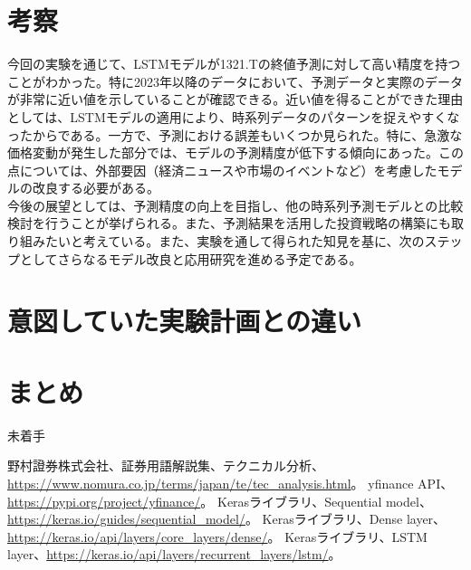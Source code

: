 \documentclass[a4paper, 11pt, titlepage]{jsarticle}
\begin{document}
\section{考察}
\indent 今回の実験を通じて、LSTMモデルが1321.Tの終値予測に対して高い精度を持つことがわかった。特に2023年以降のデータにおいて、予測データと実際のデータが非常に近い値を示していることが確認できる。近い値を得ることができた理由としては、LSTMモデルの適用により、時系列データのパターンを捉えやすくなったからである。一方で、予測における誤差もいくつか見られた。特に、急激な価格変動が発生した部分では、モデルの予測精度が低下する傾向にあった。この点については、外部要因（経済ニュースや市場のイベントなど）を考慮したモデルの改良する必要がある。\\
\indent 今後の展望としては、予測精度の向上を目指し、他の時系列予測モデルとの比較検討を行うことが挙げられる。また、予測結果を活用した投資戦略の構築にも取り組みたいと考えている。また、実験を通して得られた知見を基に、次のステップとしてさらなるモデル改良と応用研究を進める予定である。

\section{意図していた実験計画との違い}
\indent 
\section{まとめ}
未着手

\begin{thebibliography}{99}
   野村證券株式会社、証券用語解説集、テクニカル分析、\url{https://www.nomura.co.jp/terms/japan/te/tec_analysis.html}。
   yfinance API、\url{https://pypi.org/project/yfinance/}。
   Kerasライブラリ、Sequential model、\url{https://keras.io/guides/sequential_model/}。
   Kerasライブラリ、Dense layer、\url{https://keras.io/api/layers/core_layers/dense/}。
   Kerasライブラリ、LSTM layer、\url{https://keras.io/api/layers/recurrent_layers/lstm/}。
  
\end{thebibliography}
\end{document}
